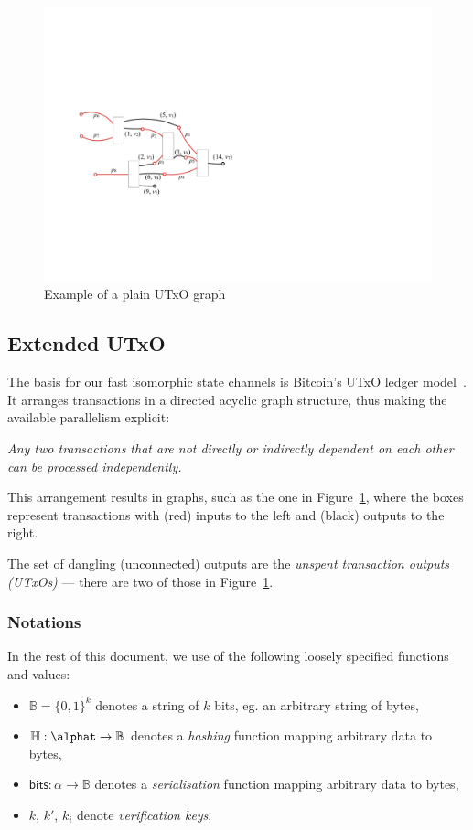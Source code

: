 \begin{figure}[t]
  \centering
 \includegraphics[width=\textwidth/2]{figures/utxo-graph.pdf}
 \caption{Example of a plain UTxO graph}
  \label{fig:utxo-graph}
\end{figure}

\subsection{Extended UTxO}
The basis for our fast isomorphic state channels is Bitcoin's UTxO ledger model~\cite{formal-model-of-bitcoin-transactions,Zahnentferner18-UTxO}. It arranges transactions in a directed acyclic graph structure, thus making the available parallelism explicit: 

\emph{Any two transactions that are not directly or indirectly dependent on each other can be processed independently.}

This arrangement results in graphs, such as the one in Figure~\ref{fig:utxo-graph},
where the boxes represent transactions with (red) inputs to the left and (black) outputs to the
right.

The set of dangling (unconnected) outputs are the \emph{unspent transaction outputs (UTxOs)} --- there are two of those in Figure~\ref{fig:utxo-graph}. 

\subsubsection{Notations}

In the rest of this document, we use of the following loosely specified functions and values: 
\begin{itemize}
   \item  $\mathbb{B} = \{0,1\}^k$ denotes a string of $k$ bits, eg. an arbitrary string of bytes, 
    \item $\mathbb{H} : \alphat \to \mathbb{B}$ denotes a \emph{hashing} function mapping arbitrary data to bytes, 
    \item $\mathsf{bits} : \alpha \to \mathbb{B}$ denotes a \emph{serialisation} function mapping arbitrary data to bytes,
    \item $k$, $k'$, $k_i$ denote \emph{verification keys},
\end{itemize}

